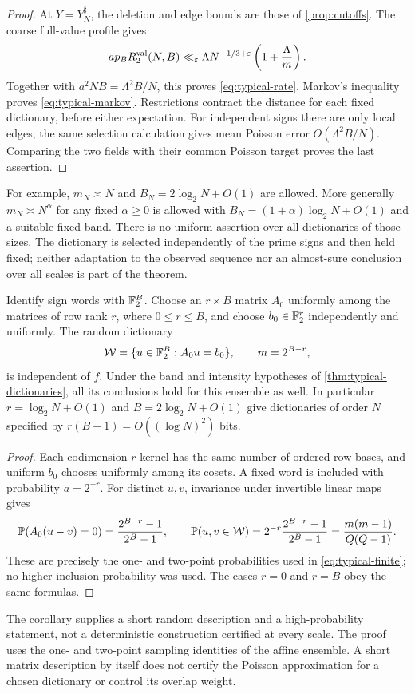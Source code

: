 \begin{proof}
At $Y=Y_N^\sharp$, the deletion and edge bounds are those of
\cref{prop:cutoffs}. The coarse full-value profile gives
\[
 ap_BR_2^{\rm val}(N,B)
 \ll_\varepsilon \Lambda N^{-1/3+\varepsilon}
                           \left(1+\frac{\Lambda}{m}\right).
\]
Together with $a^2NB=\Lambda^2B/N$, this proves
\eqref{eq:typical-rate}. Markov's inequality proves
\eqref{eq:typical-markov}. Restrictions contract the distance for each
fixed dictionary, before either expectation. For independent signs there
are only local edges; the same selection calculation gives mean Poisson
error $O(\Lambda^2B/N)$. Comparing the two fields with their common
Poisson target proves the last assertion.
\end{proof}
For example, $m_N\asymp N$ and $B_N=2\log_2N+O(1)$ are allowed.
More generally $m_N\asymp N^\alpha$ for any fixed $\alpha\ge0$ is
allowed with $B_N=(1+\alpha)\log_2N+O(1)$ and a suitable fixed band.
There is no uniform assertion over all dictionaries of those sizes.
The dictionary is selected independently of the prime signs and then
held fixed; neither adaptation to the observed sequence nor an
almost-sure conclusion over all scales is part of the theorem.

\begin{corollary}\label{cor:affine-dictionaries}
Identify sign words with $\mathbb F_2^B$. Choose an $r\times B$ matrix $A_0$
uniformly among the matrices of row rank $r$, where $0\le r\le B$,
and choose $b_0\in\mathbb F_2^r$ independently and uniformly. The random dictionary
\[
 \mathcal W=\{u\in\mathbb F_2^B:A_0u=b_0\},\qquad m=2^{B-r},
\]
is independent of $f$. Under the band and intensity hypotheses of
\cref{thm:typical-dictionaries}, all its conclusions hold for this
ensemble as well. In particular $r=\log_2N+O(1)$ and
$B=2\log_2N+O(1)$ give dictionaries of order $N$ specified by
$r(B+1)=O((\log N)^2)$ bits.
\end{corollary}
\begin{proof}
Each codimension-$r$ kernel has the same number of ordered row bases,
and uniform $b_0$ chooses uniformly among its cosets. A fixed word is
included with probability $a=2^{-r}$. For distinct $u,v$, invariance
under invertible linear maps gives
\[
 \mathbb P(A_0(u-v)=0)=\frac{2^{B-r}-1}{2^B-1},\qquad
 \mathbb P(u,v\in\mathcal W)=2^{-r}\frac{2^{B-r}-1}{2^B-1}
                      =\frac{m(m-1)}{Q(Q-1)}.
\]
These are precisely the one- and two-point probabilities used in
\eqref{eq:typical-finite}; no higher inclusion probability was used.
The cases $r=0$ and $r=B$ obey the same formulas.
\end{proof}
The corollary supplies a short random description and a high-probability
statement, not a deterministic construction certified at every scale.
The proof uses the one- and two-point sampling identities of the affine
ensemble. A short matrix description by itself does not certify the
Poisson approximation for a chosen dictionary or control its overlap
weight.

